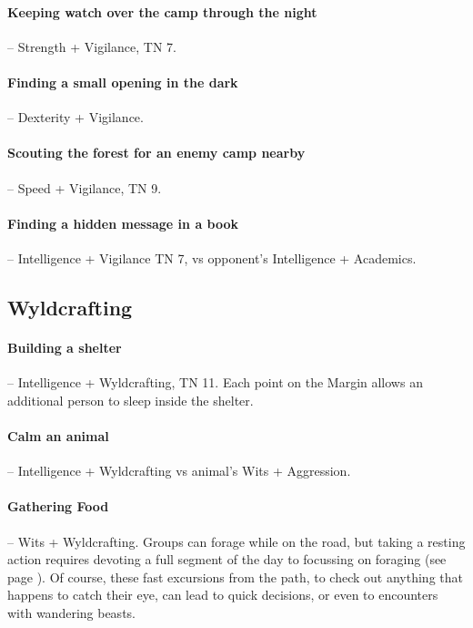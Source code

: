 \begin{multicols}{2}
\paragraph{Keeping watch over the camp through the night} -- Strength + Vigilance, TN 7.

\paragraph{Finding a small opening in the dark} -- Dexterity + Vigilance.

\paragraph{Scouting the forest for an enemy camp nearby} -- Speed + Vigilance, TN 9.

\paragraph{Finding a hidden message in a book} -- Intelligence + Vigilance TN 7, vs opponent's Intelligence + Academics.

\subsection{Wyldcrafting}

\paragraph{Building a shelter} -- Intelligence + Wyldcrafting, TN 11.
Each point on the Margin allows an additional person to sleep inside the shelter.

\paragraph{Calm an animal} -- Intelligence + Wyldcrafting vs animal's Wits + Aggression.

\paragraph{Gathering Food} -- Wits + Wyldcrafting.
Groups can forage while on the road, but taking a resting action requires devoting a full segment of the day to focussing on foraging (see page \pageref{daytimes}).
Of course, these fast excursions from the path, to check out anything that happens to catch their eye, can lead to quick decisions, or even to encounters with wandering beasts.


\end{multicols}
